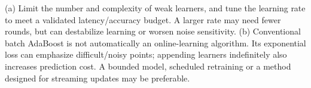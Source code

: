 (a) Limit the number and complexity of weak learners, and tune the learning rate to meet a validated latency/accuracy budget. A larger rate may need fewer rounds, but can destabilize learning or worsen noise sensitivity.
(b) Conventional batch AdaBoost is not automatically an online-learning algorithm. Its exponential loss can emphasize difficult/noisy points; appending learners indefinitely also increases prediction cost. A bounded model, scheduled retraining or a method designed for streaming updates may be preferable.

